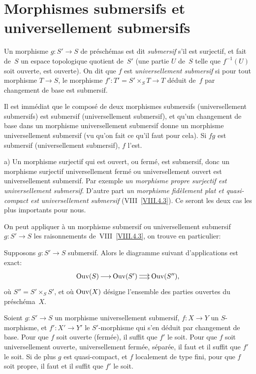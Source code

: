 \section{Morphismes submersifs et universellement submersifs}
\label{IX.2}

\begin{definition}
\label{IX.2.1}
Un morphisme $g\colon S' \to S$ de pr\'esch\'emas est dit
\emph{submersif}
s'il est surjectif, et fait de~$S$ un espace topologique quotient
de~$S'$ (\ie une partie $U$ de~$S$ telle que $f^{-1}(U)$ soit
ouverte, est ouverte). On dit que $f$ est \emph{universellement
submersif}
si pour tout morphisme $T \to S$, le morphisme $f'\colon T'=S'\times_S
T \to T$ d\'eduit de~$f$ par changement de base est submersif.
\end{definition}

Il est imm\'ediat que le compos\'e de deux morphismes submersifs
(\resp universellement submersifs) est submersif
(\resp universellement submersif), et qu'un changement de base dans un
morphisme universellement submersif donne un morphisme universellement
submersif (vu qu'on fait ce qu'il faut pour cela). Si $fg$ est
submersif (\resp universellement submersif), $f$ l'est.
\begin{exemples}
\label{IX.2.2}
a) Un morphisme surjectif qui est ouvert, ou ferm\'e, est submersif,
donc un morphisme surjectif universellement ferm\'e ou
universellement ouvert est universellement submersif. Par exemple
\emph{un morphisme propre surjectif est universellement
submersif}. D'autre part \emph{un morphisme fidèlement plat et
quasi-compact est universellement submersif} (VIII~\ref{VIII.4.3}). Ce
seront les deux cas les plus importants pour nous.
\end{exemples}

On
peut appliquer \`a un morphisme submersif ou universellement
submersif $g\colon S' \to S$ les raisonnements de~VIII~\ref{VIII.4.3},
on trouve en particulier:
\begin{proposition}
\label{IX.2.3}
Supposons $g\colon S' \to S$ submersif. Alors le diagramme suivant
d'applications est exact:
$$
\xymatrix@C=.5cm{{\mathrm{Ouv} (S)}\ar[r]&{\mathrm{Ouv} (S')}\ar@<2pt>[r]\ar@<-2pt>[r]&{\mathrm{Ouv}(S''),}}
$$
o\`u $S'' = S'\times_S S'$, et o\`u $\operatorname{Ouv}(X)$ d\'esigne
l'ensemble des parties ouvertes du pr\'esch\'ema~$X$.
\end{proposition}

\begin{proposition}
\label{IX.2.4}
Soient $g\colon S' \to S$ un morphisme universellement submersif,
$f\colon X \to Y$ un $S$-morphisme, et $f'\colon X' \to Y'$ le
$S'$-morphisme qui s'en d\'eduit par changement de base. Pour que
$f$ soit ouverte (\resp ferm\'ee), il suffit que $f'$ le soit. Pour
que $f$ soit universellement ouverte, \resp universellement
ferm\'ee, \resp s\'epar\'ee, il faut et il suffit que $f'$ le
soit. Si de plus $g$ est quasi-compact, et $f$ localement de type
fini, pour que $f$ soit propre, il faut et il suffit que $f'$ le soit.
\end{proposition}


